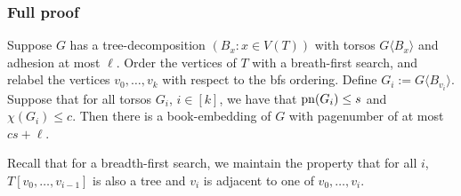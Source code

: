 \subsubsection{Full proof}
\begin{theorem}
	Suppose \(G\) has a tree-decomposition \((B_x: x \in V(T))\) with torsos \(G \langle B_x \rangle\) and adhesion at most \(\ell\). Order the vertices of \(T\) with a breath-first search, and relabel the vertices \(v_0, \ldots, v_k\) with respect to the bfs ordering. Define \(G_i := G \langle B_{v_i} \rangle \). Suppose that for all torsos \(G_i\), \(i \in [k]\), we have that \(\operatorname{pn}(G_i) \leq s\) and \(\chi(G_i) \leq c\). Then there is a book-embedding of \(G\) with pagenumber of at most \(cs + \ell\). 
\end{theorem}
Recall that for a breadth-first search, we maintain the property that for all \(i\), \(T[v_0, \ldots, v_{i - 1}]\) is also a tree and \(v_i\) is adjacent to one of \(v_0, \ldots, v_{i}\). 
